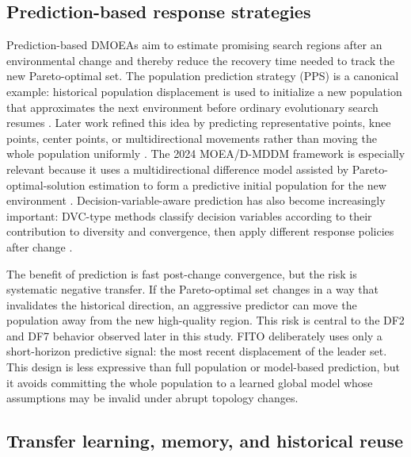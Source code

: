 \documentclass[preprint,12pt]{elsarticle}
\begin{document}
\subsection{Prediction-based response strategies}

Prediction-based DMOEAs aim to estimate promising search regions after an environmental change and thereby reduce the recovery time needed to track the new Pareto-optimal set. The population prediction strategy (PPS) is a canonical example: historical population displacement is used to initialize a new population that approximates the next environment before ordinary evolutionary search resumes \cite{Zhou2014Population}. Later work refined this idea by predicting representative points, knee points, center points, or multidirectional movements rather than moving the whole population uniformly \cite{Rong2020Multi,Wu2023DSSP,Gao2024CenterMultiDirection,Gao2024MDDM}. The 2024 MOEA/D-MDDM framework is especially relevant because it uses a multidirectional difference model assisted by Pareto-optimal-solution estimation to form a predictive initial population for the new environment \cite{Gao2024MDDM}. Decision-variable-aware prediction has also become increasingly important: DVC-type methods classify decision variables according to their contribution to diversity and convergence, then apply different response policies after change \cite{Liu2021Heterogeneous,Wu2023DVC}.

The benefit of prediction is fast post-change convergence, but the risk is systematic negative transfer. If the Pareto-optimal set changes in a way that invalidates the historical direction, an aggressive predictor can move the population away from the new high-quality region. This risk is central to the DF2 and DF7 behavior observed later in this study. FITO deliberately uses only a short-horizon predictive signal: the most recent displacement of the leader set. This design is less expressive than full population or model-based prediction, but it avoids committing the whole population to a learned global model whose assumptions may be invalid under abrupt topology changes.

\subsection{Transfer learning, memory, and historical reuse}
\end{document}
